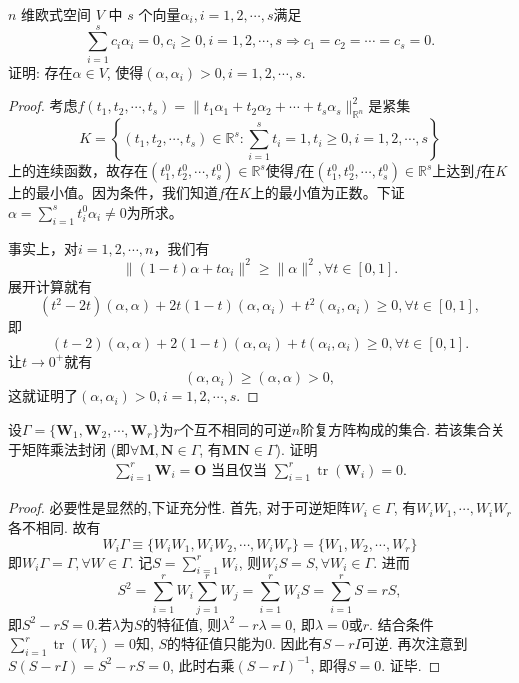 \documentclass[../../main.tex]{subfiles}%
\begin{document}
\begin{example}
\( n \) 维欧式空间 \( V \) 中 \( s \) 个向量\(\alpha_i, i = 1,2,\cdots,s\)满足
\[
\sum_{i=1}^{s} c_i \alpha_i = 0, c_i \geqslant 0, i = 1,2,\cdots,s \Rightarrow c_1 = c_2 = \cdots = c_s = 0.
\]
证明: 存在\(\alpha \in V\), 使得\((\alpha, \alpha_i) > 0, i = 1,2,\cdots,s\).
\end{example}
\begin{proof}

考虑\( f(t_1, t_2, \cdots, t_s) = \| t_1 \alpha_1 + t_2 \alpha_2 + \cdots + t_s \alpha_s \|_{\mathbb{R}^n}^2 \)是紧集
\[
K = \left\{ (t_1, t_2, \cdots, t_s) \in \mathbb{R}^s: \sum_{i=1}^s t_i = 1, t_i \geqslant 0, i = 1, 2, \cdots, s \right\}
\]
上的连续函数，故存在\( (t_1^0, t_2^0, \cdots, t_s^0) \in \mathbb{R}^s \)使得\( f \)在\( (t_1^0, t_2^0, \cdots, t_s^0) \in \mathbb{R}^s \)上达到\( f \)在\( K \)上的最小值。因为条件，我们知道\( f \)在\( K \)上的最小值为正数。下证\( \alpha = \sum_{i=1}^s t_i^0 \alpha_i \neq 0 \)为所求。

事实上，对\( i = 1, 2, \cdots, n \)，我们有
\[
\| (1 - t) \alpha + t \alpha_i \|^2 \geqslant \| \alpha \|^2, \forall t \in [0, 1].
\]
展开计算就有
\[
(t^2 - 2t) (\alpha, \alpha) + 2t (1 - t) (\alpha, \alpha_i) + t^2 (\alpha_i, \alpha_i) \geqslant 0, \forall t \in [0, 1],
\]
即
\[
(t - 2) (\alpha, \alpha) + 2 (1 - t) (\alpha, \alpha_i) + t (\alpha_i, \alpha_i) \geqslant 0, \forall t \in [0, 1].
\]
让\( t \to 0^+ \)就有
\[
(\alpha, \alpha_i) \geqslant (\alpha, \alpha) > 0,
\]
这就证明了\( (\alpha, \alpha_i) > 0, i = 1, 2, \cdots, s \).

\end{proof}

\begin{example}
设\(\varGamma = \{\boldsymbol{W}_1, \boldsymbol{W}_2, \cdots, \boldsymbol{W}_r\}\)为\(r\)个互不相同的可逆\(n\)阶复方阵构成的集合. 若该集合关于矩阵乘法封闭 (即\(\forall \boldsymbol{M}, \boldsymbol{N} \in \varGamma\), 有\(\boldsymbol{MN} \in \varGamma\)). 证明
\begin{align*}
\sum_{i=1}^r \boldsymbol{W}_i = \boldsymbol{O} \text{ 当且仅当 } \sum_{i=1}^r \operatorname{tr}\left( \boldsymbol{W}_i \right) = 0.
\end{align*}
\end{example}
\begin{proof}

必要性是显然的,下证充分性.
首先, 对于可逆矩阵\( W_i \in \varGamma \), 有\( W_iW_1, \cdots, W_iW_r \)各不相同. 故有
\[
W_i\varGamma \equiv \{ W_iW_1, W_iW_2, \cdots, W_iW_r \} = \{ W_1, W_2, \cdots, W_r \}
\]
即\( W_i\varGamma = \varGamma, \forall W \in \varGamma \).
记\( S = \sum_{i=1}^r W_i \), 则\( W_iS = S, \forall W_i \in \varGamma \). 进而
\[
S^2=\sum_{i=1}^r{W_i\sum_{j=1}^r{W_j}}=\sum_{i=1}^r{W_iS}=\sum_{i=1}^r{S}=rS,
\]
即$S^2-rS=0$.若\( \lambda \)为\( S \)的特征值, 则\( \lambda^2 - r\lambda = 0 \), 即\( \lambda = 0 \)或\( r \).
结合条件\( \sum_{i=1}^r \operatorname{tr}\left( W_i \right) = 0 \)知, \( S \)的特征值只能为\( 0 \). 因此有\( S - rI \)可逆.
再次注意到\( S(S - rI) = S^2 - rS = 0 \), 此时右乘\( (S - rI)^{-1} \), 即得\( S = 0 \). 证毕.

\end{proof}
\end{document}
